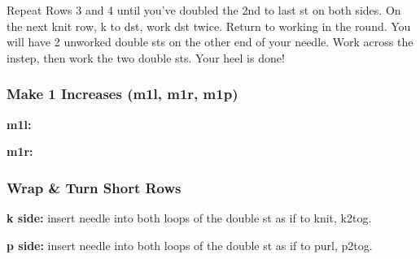 \documentclass[12pt]{article}
\newcommand{\rowDir}[1]{\textbf{#1:}} %
\newenvironment{frnote}
    {%
    	\setlength{\FrameRule}{1.5pt}
    	\def\FrameCommand{\fboxrule=\FrameRule\fboxsep=\FrameSep \fcolorbox{framecolor}{shadecolor}}
    	\MakeFramed {\FrameRestore}}
    {\setlength{\FrameRule}{1pt}
	\endMakeFramed}
\begin{document}
\begin{multicols}{2}
Repeat Rows 3 and 4 until you've doubled the 2nd to last st on both sides. On the next knit row, k to dst, work dst twice. Return to working in the round. You will have 2 unworked double sts on the other end of your needle. Work across the instep, then work the two double sts. Your heel is done!

\vfill
\columnbreak

\begin{frnote} \vspace{-1em}
\subsubsection*{Make 1 Increases (m1l, m1r, m1p)}
\rowDir{m1l} 

\rowDir{m1r}
\end{frnote}


\begin{frnote} \vspace{-1em}
\subsubsection*{Wrap \& Turn Short Rows}
\rowDir{k side} insert needle into both loops of the double st as if to knit, k2tog.

\rowDir{p side} insert needle into both loops of the double st as if to purl, p2tog.
\end{frnote}

\end{multicols}

\end{document}
